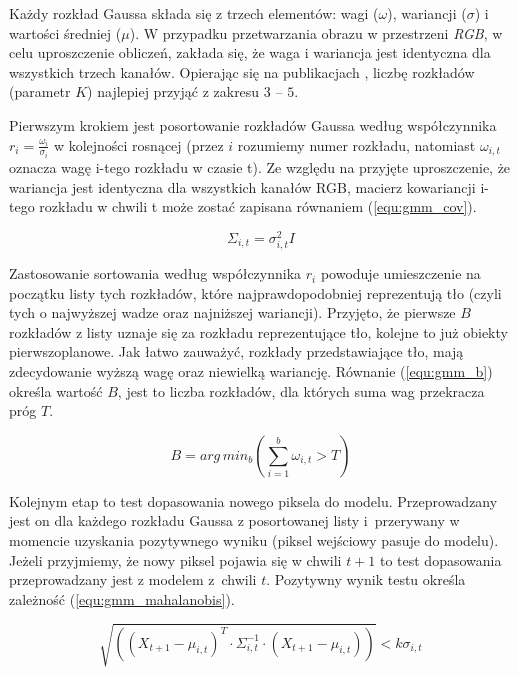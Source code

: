 Każdy rozkład Gaussa składa się z trzech elementów: wagi ($\omega$), wariancji ($\sigma$) i wartości średniej ($\mu$). 
W przypadku przetwarzania obrazu w przestrzeni \textit{RGB}, w celu uproszczenie obliczeń, zakłada się, że waga i wariancja jest identyczna dla wszystkich trzech kanałów. 
Opierając się na publikacjach \cite{Stauffer_Grimson_99, piszczek_15}, liczbę rozkładów (parametr $K$) najlepiej przyjąć z zakresu $3$ -- $5$.  


Pierwszym krokiem jest posortowanie rozkładów Gaussa według współczynnika $r_i = \frac{\omega_i}{\sigma_i}$ w kolejności rosnącej (przez $i$ rozumiemy numer rozkładu, natomiast $\omega_{i,t}$ oznacza wagę i-tego rozkładu w czasie t). 
Ze względu na przyjęte uproszczenie, że wariancja jest identyczna dla wszystkich kanałów RGB, macierz kowariancji i-tego rozkładu w chwili t może zostać zapisana równaniem (\ref{equ:gmm_cov}).

    \begin{equation}
        \Sigma_{i,t} = \sigma_{i,t}^2 I
    \label{equ:gmm_cov}
    \end{equation}

Zastosowanie sortowania według współczynnika $r_i$ powoduje umieszczenie na początku listy tych rozkładów, które najprawdopodobniej reprezentują tło (czyli tych o najwyższej wadze oraz najniższej wariancji). 
Przyjęto, że pierwsze $B$ rozkładów z listy uznaje się za rozkładu reprezentujące tło, kolejne to już obiekty pierwszoplanowe. 
Jak łatwo zauważyć, rozkłady przedstawiające tło, mają zdecydowanie wyższą wagę oraz niewielką wariancję. 
Równanie (\ref{equ:gmm_b}) określa wartość $B$, jest to liczba rozkładów, dla których suma wag przekracza próg $T$.


    \begin{equation}
        B = arg\,min_b \left(\sum_{i=1}^{b} \omega_{i,t} > T\right)
    \label{equ:gmm_b}
    \end{equation}

Kolejnym etap to test dopasowania nowego piksela do modelu. 
Przeprowadzany jest on dla każdego rozkładu Gaussa z posortowanej listy i~przerywany w momencie uzyskania pozytywnego wyniku (piksel wejściowy pasuje do modelu). 
Jeżeli przyjmiemy, że nowy piksel pojawia się w chwili $t+1$ to test dopasowania przeprowadzany jest z modelem z~chwili $t$. 
Pozytywny wynik testu określa zależność (\ref{equ:gmm_mahalanobis}).

    \begin{equation}
        \sqrt{ \left( \left( X_{t+1} - \mu_{i,t} \right)^T \cdot \Sigma_{i,t}^{-1} \cdot \left( X_{t+1} - \mu_{i,t} \right) \right)} < k \sigma_{i,t}
    \label{equ:gmm_mahalanobis}
    \end{equation}

